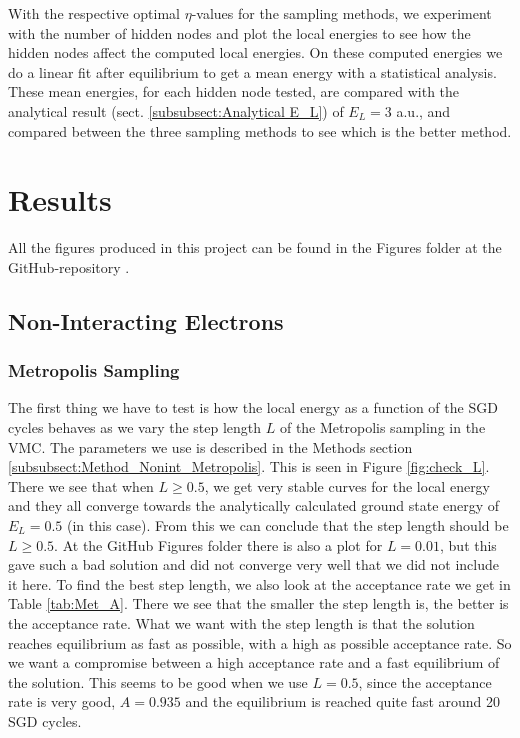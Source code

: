 \documentclass[12pt,a4paper,english]{article}
\begin{document}
With the respective optimal $\eta$-values for the sampling methods, we experiment with the number of hidden nodes and plot the local energies to see how the hidden nodes affect the computed local energies. On these computed energies we do a linear fit after equilibrium to get a mean energy with a statistical analysis. These mean energies, for each hidden node tested, are compared with the analytical result (sect. \ref{subsubsect:Analytical E_L}) of $E_L=3$ a.u., and compared between the three sampling methods to see which is the better method.


\section{Results}
\label{sect:Results}
All the figures produced in this project can be found in the Figures folder at the GitHub-repository \cite{GitHub}.
\subsection{Non-Interacting Electrons}
\label{subsect:Results_nonint}
\subsubsection{Metropolis Sampling}
\label{subsubsect:Results_nonint_Metropolis}
The first thing we have to test is how the local energy as a function of the SGD cycles behaves as we vary the step length $L$ of the Metropolis sampling in the VMC. The parameters we use is described in the Methods section \ref{subsubsect:Method_Nonint_Metropolis}. This is seen in Figure \ref{fig:check_L}. There we see that when $L\geq0.5$, we get very stable curves for the local energy and they all converge towards the analytically calculated ground state energy of $E_L=0.5$ (in this case). From this we can conclude that the step length should be $L\geq0.5$. At the GitHub Figures folder there is also a plot for $L=0.01$, but this gave such a bad solution and did not converge very well that we did not include it here. To find the best step length, we also look at the acceptance rate we get in Table \ref{tab:Met_A}. There we see that the smaller the step length is, the better is the acceptance rate. What we want with the step length is that the solution reaches equilibrium as fast as possible, with a high as possible acceptance rate. So we want a compromise between a high acceptance rate and a fast equilibrium of the solution. This seems to be good when we use $L=0.5$, since the acceptance rate is very good, $A=0.935$ and the equilibrium is reached quite fast around 20 SGD cycles.
\end{document}
